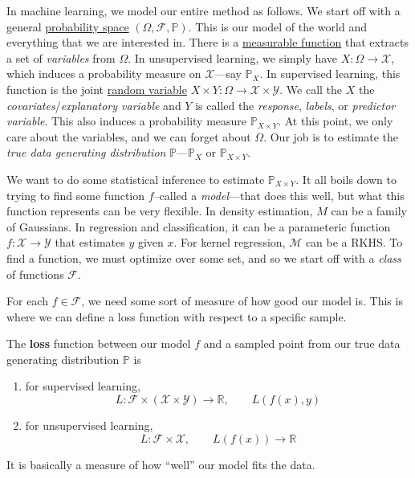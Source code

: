 In machine learning, we model our entire method as follows. We start off with a general \hyperref[prob-def:probability-space]{probability space} $(\Omega, \mathcal{F}, \mathbb{P})$. This is our model of the world and everything that we are interested in. There is a \hyperref[mt-def:measurable-function]{measurable function} that extracts a set of \textit{variables} from $\Omega$. In unsupervised learning, we simply have $X: \Omega \to \mathcal{X}$, which induces a probability measure on $\mathcal{X}$---say $\mathbb{P}_X$. In supervised learning, this function is the joint \hyperref[prob-def:random-variable]{random variable} $X \times Y: \Omega \to \mathcal{X} \times \mathcal{Y}$. We call the $X$ the \textit{covariates}/\textit{explanatory variable} and $Y$ is called the \textit{response}, \textit{labels}, or \textit{predictor variable}. This also induces a probability measure $\mathbb{P}_{X \times Y}$. At this point, we only care about the variables, and we can forget about $\Omega$. Our job is to estimate the \textit{true data generating distribution} $\mathbb{P}$---$\mathbb{P}_{X}$ or $\mathbb{P}_{X \times Y}$. 

We want to do some statistical inference to estimate $\mathbb{P}_{X \times Y}$. It all boils down to trying to find some function $f$--called a \textit{model}---that does this well, but what this function represents can be very flexible. In density estimation, $M$ can be a family of Gaussians. In regression and classification, it can be a parameteric function $f: \mathcal{X} \to \mathcal{Y}$ that estimates $y$ given $x$. For kernel regression, $\mathcal{M}$ can be a RKHS. To find a function, we must optimize over some set, and so we start off with a \textit{class} of functions $\mathcal{F}$. 

For each $f \in \mathcal{F}$, we need some sort of measure of how good our model is. This is where we can define a loss function with respect to a specific sample. 

\begin{definition}[Loss]
  \label{def:loss}
  The \textbf{loss} function between our model $f$ and a sampled point from our true data generating distribution $\mathbb{P}$ is 
  \begin{enumerate}
    \item for supervised learning, 
    \begin{equation}
      L: \mathcal{F} \times (\mathcal{X} \times \mathcal{Y}) \to \mathbb{R}, \qquad L(f(x), y)
    \end{equation} 
    \item for unsupervised learning, 
    \begin{equation}
      L: \mathcal{F} \times \mathcal{X}, \qquad L(f(x)) \to \mathbb{R}
    \end{equation}
  \end{enumerate}
  It is basically a measure of how ``well'' our model fits the data. 
\end{definition} 

